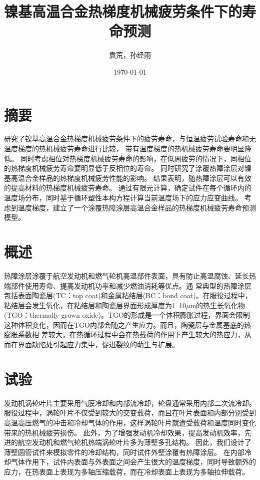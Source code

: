 \documentclass{article}
\begin{document}
\title{镍基高温合金热梯度机械疲劳条件下的寿命预测}

\author{袁荒，孙经雨}
\date{\today}
\maketitle
\tableofcontents

\section*{摘要}
研究了镍基高温合金热梯度机械疲劳条件下的疲劳寿命，与恒温疲劳试验寿命和无温度梯度的热机械疲劳寿命进行比较，
带有温度梯度的热机械疲劳寿命要明显降低。
同时考虑相位对热梯度机械疲劳寿命的影响，在低周疲劳的情况下，同相位的热梯度机械疲劳寿命要明显低于反相位的寿命。
同时研究了涂覆热障涂层对镍基高温合金样品的热梯度机械疲劳性能的影响。
结果表明，随热障涂层可以有效的提高材料的热梯度机械疲劳寿命。
通过有限元计算，确定试件在每个循环内的温度场分布，同时基于循环塑性本构方程计算当前温度场下的应力应变曲线。
考虑到温度梯度，建立了一个涂覆热障涂层高温合金样品的热梯度机械疲劳寿命预测模型。

\section{概述}
热障涂层涂覆于航空发动机和燃气轮机高温部件表面，具有防止高温腐蚀、延长热端部件使用寿命、提高发动机功率和减少燃油消耗等优点。通
常典型的热障涂层包括表面陶瓷层(TC：top coat)和金属粘结层(BC：bond coat)。在服役过程中，粘结层会发生氧化，在粘结层和陶瓷层界面形成厚度为1~10$\mu$m的热生长氧化物(TGO：thermally grown oxide)。TGO的形成是一个体积膨胀过程，界面会限制这种体积变化，因而在TGO内部会随之产生应力。而且，陶瓷层与金属基底的热膨胀系数相
差较大，在热循环过程中会在热载荷的作用下产生较大的热应力，从而在界面缺陷处引起应力集中，促进裂纹的萌生与扩展。
\section{试验}
发动机涡轮叶片主要采用气膜冷却和内部流冷却，轮盘通常采用内部二次流冷却。
服役过程中，涡轮叶片不仅受到较大的交变载荷，而且在叶片表面和内部分别受到高温高压燃气的冲击和冷却气体的作用，这样涡轮叶片就遭受载荷和温度同时变化带来的热机械疲劳损伤。
此外，为了增强发动机冷却效果，提高发动机效率，先进的航空发动机和燃气轮机热端涡轮叶片多为薄壁多孔结构。
因此，我们设计了薄壁圆管试件来模拟零件的冷却结构，同时试件外壁涂覆有热障涂层。
在内部冷却气体作用下，试件内表面与外表面之间会产生很大的温度梯度，同时导致额外的应力，在热表面上表现为多轴压缩载荷，而在冷却表面上表现为多轴拉伸载荷。
\end{document}

